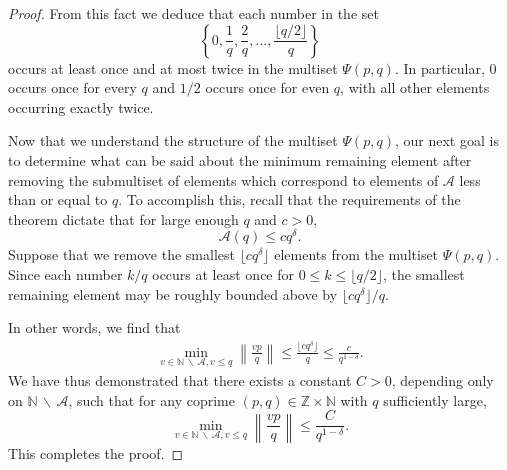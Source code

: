 \documentclass[10pt,a4paper]{amsart}
\newcommand{\dnint}[1]{\left\|{#1}\right\|}
\begin{document}
\begin{proof}
From this fact we deduce that each number in the set
\begin{equation*}
\left\{0,\frac{1}{q},\frac{2}{q},\dots,\frac{\lfloor{q/2}\rfloor}{q}\right\}
\end{equation*}
occurs at least once and at most twice in the multiset $\Psi(p,q)$.  In particular, $0$ occurs once for every $q$ and $1/2$ occurs once for even $q$, with all other elements occurring exactly twice.

Now that we understand the structure of the multiset $\Psi(p,q)$, our next goal is to determine what can be said about the minimum remaining element after removing the submultiset of elements which correspond to elements of $\mathcal{A}$ less than or equal to $q$.  To accomplish this, recall that the requirements of the theorem dictate that for large enough $q$ and $c > 0$,
\begin{equation*}
\mathcal{A}(q) \leq c q^{\delta}.
\end{equation*}
Suppose that we remove the smallest $\lfloor{c q^{\delta}}\rfloor$ elements from the multiset $\Psi(p,q)$.  Since each number $k/q$ occurs at least once for $0 \leq k \leq \lfloor{q/2}\rfloor$, the smallest remaining element may be roughly bounded above by ${\lfloor{c q^{\delta}}\rfloor/q}$.

In other words, we find that
\begin{align*}
\min_{v\in\mathbb{N} \,\backslash \,\mathcal{A}, v\leq q}\dnint{\frac{v p}{q}} \leq \frac{\lfloor{c q^{\delta}}\rfloor}{q} \leq \frac{c}{q^{1-\delta}}.
\end{align*}
We have thus demonstrated that there exists a constant $C > 0$, depending only on $\mathbb{N} \,\backslash \,\mathcal{A}$, such  that for any coprime $(p,q)\in\mathbb{Z}\times\mathbb{N}$ with $q$ sufficiently large,
\begin{equation*}
    \min_{v\in\mathbb{N} \,\backslash \,\mathcal{A}, v\leq q}\dnint{\frac{v p}{q}} \leq \frac{C}{q^{1-\delta}}.
\end{equation*}
This completes the proof.
\end{proof}
\end{document}
